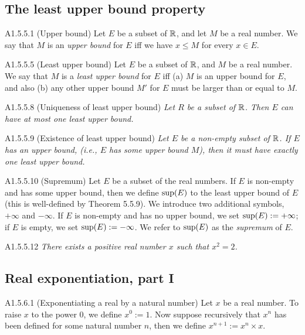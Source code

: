 \subsection{The least upper bound property}
\begin{definition}{A1.5.5.1}
    (Upper bound) Let $E$ be a subset of $\mathbb{R}$, and let $M$ be a real number. We
    say that $M$ is an \emph{upper bound} for $E$ iff we have $x \leq M$ for every
    $x \in E$.
\end{definition}

\begin{definition}{A1.5.5.5}
    (Least upper bound) Let $E$ be a subset of $\mathbb{R}$, and $M$ be a real number.
    We say that $M$ is a \emph{least upper bound} for $E$ iff (a) $M$ is an upper
    bound for $E$, and also (b) any other upper bound $M'$ for $E$ must be larger
    than or equal to $M$.
\end{definition}

\begin{proposition}{A1.5.5.8}
    (Uniqueness of least upper bound) \emph{Let $R$ be a subset of $\mathbb{R}$. Then $E$
    can have at most one least upper bound.}
\end{proposition}

\begin{theorem}{A1.5.5.9}
    (Existence of least upper bound) \emph{Let $E$ be a non-empty subset of $\mathbb{R}$.
    If $E$ has an upper bound, (i.e., $E$ has some upper bound $M$), then it must
    have exactly one least upper bound.}
\end{theorem}

\begin{definition}{A1.5.5.10}
    (Supremum) Let $E$ be a subset of the real numbers. If $E$ is non-empty and
    has some upper bound, then we define $\text{sup}{(E)}$ to the least upper bound of $E$
    (this is well-defined by Theorem 5.5.9). We introduce two additional symbols,
    $+\infty$ and $-\infty$. If $E$ is non-empty and has no upper bound, we set
    $\text{sup}{(E)} := +\infty$; if $E$ is empty, we set $\text{sup}{(E)} := -\infty$.
    We refer to $\text{sup}{(E)}$ as the \emph{supremum} of $E$.
\end{definition}

\begin{proposition}{A1.5.5.12}
    \emph{There exists a positive real number $x$ such that $x^2 = 2$.}
\end{proposition}

\subsection{Real exponentiation, part I}
\begin{definition}{A1.5.6.1}
    (Exponentiating a real by a natural number) Let $x$ be a real number. To
    raise $x$ to the power $0$, we define $x^0 := 1$. Now suppose recursively
    that $x^n$ has been defined for some natural number $n$, then we define
    $x^{n+1} := x^n \times x$.
\end{definition}


